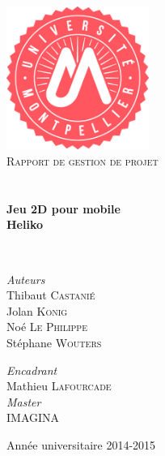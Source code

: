 \begin{titlepage}
\begin{center}

\includegraphics[width=0.35\textwidth]{./img/logoUM}~\\[1cm]

\textsc{\LARGE Rapport de gestion de projet}\\[1.5cm]

\textsc{\Large }\\[0.5cm]

\HRule \\[0.4cm]

{\huge \bfseries Jeu 2D pour mobile\\
Heliko \\[0.4cm] }

\HRule \\[1.5cm]

\begin{minipage}{0.4\textwidth}
\begin{flushleft} \large
\emph{Auteurs}\\
Thibaut \textsc{Castanié}\\
Jolan \textsc{Konig}\\
Noé \textsc{Le Philippe}\\
Stéphane \textsc{Wouters}
\end{flushleft}
\end{minipage}
\begin{minipage}{0.4\textwidth}
\begin{flushright} \large
\emph{Encadrant} \\
Mathieu \textsc{Lafourcade}\\
\emph{Master} \\
\textsc{IMAGINA}
\end{flushright}
\end{minipage}

\vfill

{\large Année universitaire 2014-2015}

\end{center}
\end{titlepage}
